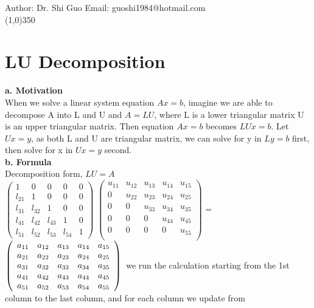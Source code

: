 \documentclass[a4paper]{article}
\begin{document}
Author: Dr. Shi Guo  \hspace{30mm} Email: guoshi1984@hotmail.com\\
\line(1,0){350}
\section{LU Decomposition}
{\bf a. Motivation}\\
When we solve a linear system equation $Ax=b$, imagine we are able to decompose A into L and U and $A=LU$, where L is a lower triangular matrix U is an upper triangular matrix. Then equation $Ax=b$ becomes $LUx=b$. Let $Ux=y$, as both L and U are triangular matrix, we can solve for y in $Ly=b$ first, then solve for x in $Ux=y$ second.\\
{\bf b. Formula}\\
Decomposition form, $LU=A$\\
$\left( \begin{array}{ccccc}
1      & 	0 	& 	0 	 & 	 0 		& 	0 	\\
l_{21} & 	1 	& 	0 	 &	 0 		& 	0	\\
l_{31} & l_{32} &   1  	 &   0		&	0	\\
l_{41} & l_{42} & l_{43} &   1 		& 	0	\\
l_{51} & l_{52} & l_{53} & l_{54} 	& 	1	\end{array} \right)$
$\left( \begin{array}{ccccc}
u_{11} 	& u_{12} & 	 u_{13}  & 	u_{14} & u_{15} 	\\
	0	& u_{22} & 	 u_{23}  &	u_{24} & u_{25}	\\
	0	& 	0	 &   u_{33}  &  u_{34} &	u_{35}	\\
	0 	& 	0	 & 	 0		 &  u_{44} & 	u_{45}	\\
	0	& 	0	 & 	 0 		 &  0    & 	u_{55}	\\\end{array} \right)
$
=$\left( \begin{array}{ccccc}
a_{11} & a_{12} & 	a_{13} 	 & 	 a_{14} 	& 	a_{15} 	\\
a_{21} & a_{22} & 	a_{23} 	 &	 a_{24} 	& 	a_{25}	\\
a_{31} & a_{32} &   a_{33}   &   a_{34}		&	a_{35}	\\
a_{41} & a_{42} & 	a_{43} 	 &   a_{44} 	& 	a_{45}	\\
a_{51} & a_{52} & 	a_{53}	 & 	 a_{54} 	& 	a_{55}	\\\end{array} \right)\\
$
we run the calculation starting from the 1st column to the last column, and for each column we update from
\end{document}
